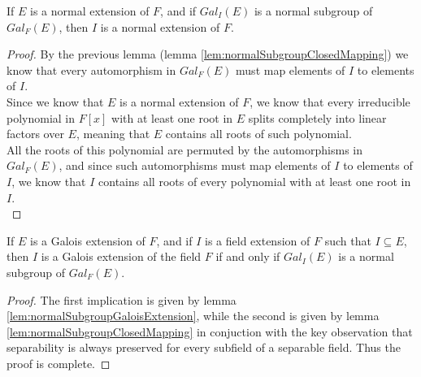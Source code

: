 \begin{lemma}
    If $E$ is a normal extension of $F$, and if $Gal_{I}(E)$ is a normal 
    subgroup of $Gal_{F}(E)$, then $I$ is a normal extension of $F$.
\end{lemma}
\begin{proof}
    By the previous lemma (lemma \ref{lem:normalSubgroupClosedMapping}) we know that every 
    automorphism in $Gal_{F}(E)$ must map elements of $I$ to elements of $I$. \\

    Since we know that $E$ is a normal extension of $F$, we know that every irreducible
    polynomial in $F[x]$ with at least one root in $E$ splits completely into linear factors
    over $E$, meaning that $E$ contains all roots of such polynomial. \\

    All the roots of this polynomial are permuted by the automorphisms in $Gal_{F}(E)$, 
    and since such automorphisms must map elements of $I$ to elements of $I$, we know that
    $I$ contains all roots of every polynomial with at least one root in $I$. \\
\end{proof}

\begin{theorem} 
    If $E$ is a Galois extension of $F$, and if $I$ is a field extension of $F$ such that
    $I \subseteq E$, then $I$ is a Galois extension of the field $F$ if and only if 
    $Gal_{I}(E)$ is a normal subgroup of $Gal_{F}(E)$.
\end{theorem}
\begin{proof}
    The first implication is given by lemma \ref{lem:normalSubgroupGaloisExtension}, while 
    the second is given by lemma \ref{lem:normalSubgroupClosedMapping} in conjuction with 
    the key observation that separability is always preserved for every subfield of a 
    separable field. Thus the proof is complete.
\end{proof}

\newpage
